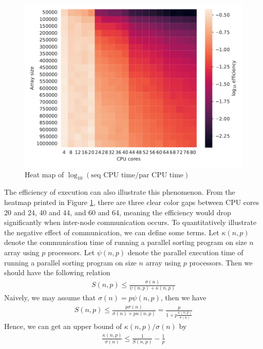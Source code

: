 \documentclass[twoside,12pt]{article}
\theoremstyle{definition}
\theoremstyle{remark}
\begin{document}
\begin{figure}[t!]
    \centering
    \includegraphics[width=\textwidth]{../analysis/logeff_heatmap.pdf}
    \caption{Heat map of $\log_{10} (\text{seq CPU time}/\text{par CPU time})$ }
    \label{fig:logeff}
\end{figure}


The efficiency of execution can also illustrate this phenomenon.
From the heatmap printed in Figure \ref{fig:logeff}, there are three clear color
gaps between CPU cores 20 and 24, 40 and 44, and 60 and 64, meaning the efficiency
would drop significantly when inter-node communication occurs.
To quantitatively illustrate the negative effect of communication, we can
define some terms.
Let $\kappa(n, p)$ denote the communication time of running a parallel sorting
program on size $n$ array using $p$ processors.
Let $\psi(n, p)$ denote the parallel execution time of running a parallel sorting
program on size $n$ array using $p$ processors.
Then we should have the following relation
\begin{align}
    S(n, p)\leq \frac{\sigma(n)}{\psi(n, p) + \kappa(n, p)}
\end{align}
Naively, we may assume that $\sigma(n)=p\psi(n, p)$, then we have 
\begin{align}
    S(n, p)\leq \frac{p\sigma(n)}{\sigma(n) + p\kappa(n, p)} = 
    \frac{p}{1 + p\frac{\kappa(n,p)}{\sigma(n)}}
\end{align}
Hence, we can get an upper bound of $\kappa(n,p)/\sigma(n)$ by
\begin{align}
    \frac{\kappa(n, p)}{\sigma(n)} \leq \frac{1}{S(n,p)} - \frac{1}{p}
\end{align}
\end{document}
